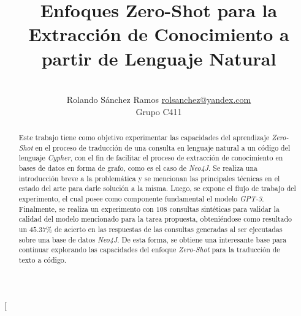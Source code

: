 \documentclass[a4paper,10pt,twocolumn]{article}
\title{Enfoques Zero-Shot para la Extracción de Conocimiento a partir de Lenguaje Natural}
\author{\\
\name Rolando S\'anchez Ramos \email \href{mailto:rolsanchez@yandex.com}{rolsanchez@yandex.com}
	\\ \addr Grupo C411}
\begin{document}
\twocolumn[

\maketitle


\begin{abstract}

	Este trabajo tiene como objetivo experimentar las capacidades del aprendizaje \textit{Zero-Shot} en el proceso de traducción de una consulta en lenguaje natural a un código del lenguaje \textit{Cypher}, con el fin de facilitar el proceso de extracción de conocimiento en bases de datos en forma de grafo, como es el caso de \textit{Neo4J}. Se realiza una introducción breve a la problemática y se mencionan las principales técnicas en el estado del arte para darle solución a la misma. Luego, se expone el flujo de trabajo del experimento, el cual posee como componente fundamental el modelo \textit{GPT-3}. Finalmente, se realiza un experimento con $108$ consultas sintéticas para validar la calidad del modelo mencionado para la tarea propuesta, obteniéndose como resultado un $45.37\%$ de acierto en las respuestas de las consultas generadas al ser ejecutadas sobre una base de datos \textit{Neo4J}. De esta forma, se obtiene una interesante base para continuar explorando las capacidades del enfoque \textit{Zero-Shot} para la traducción de texto a código.
	
\end{abstract}

\vspace{0.5cm}
\end{document}
